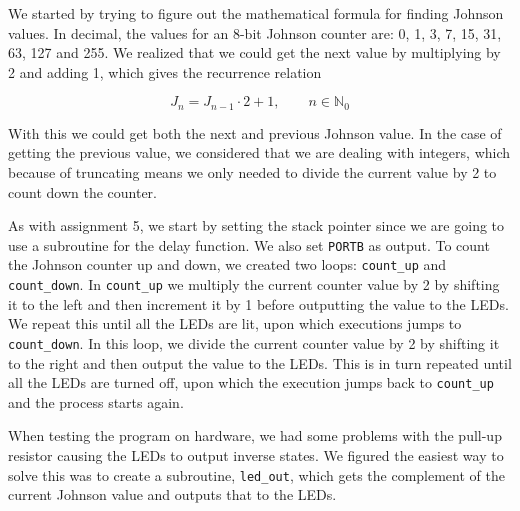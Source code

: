 We started by trying to figure out the mathematical formula for finding Johnson values. In decimal, the values for an 8-bit Johnson counter are: 0, 1, 3, 7, 15, 31, 63, 127 and 255. We realized that we could get the next value by multiplying by 2 and adding 1, which gives the recurrence relation

\begin{equation*}
    J_n = J_{n-1} \cdot 2 + 1, \qquad n \in \mathbb{N}_0
\end{equation*}

With this we could get both the next and previous Johnson value. In the case of getting the previous value, we considered that we are dealing with integers, which because of truncating means we only needed to divide the current value by 2 to count down the counter.

As with assignment 5, we start by setting the stack pointer since we are going to use a subroutine for the delay function. We also set \texttt{PORTB} as output. To count the Johnson counter up and down, we created two loops: \texttt{count\_up} and \texttt{count\_down}. In \texttt{count\_up} we multiply the current counter value by 2 by shifting it to the left and then increment it by 1 before outputting the value to the LEDs. We repeat this until all the LEDs are lit, upon which executions jumps to \texttt{count\_down}. In this loop, we divide the current counter value by 2 by shifting it to the right and then output the value to the LEDs. This is in turn repeated until all the LEDs are turned off, upon which the execution jumps back to \texttt{count\_up} and the process starts again.

When testing the program on hardware, we had some problems with the pull-up resistor causing the LEDs to output inverse states. We figured the easiest way to solve this was to create a subroutine, \texttt{led\_out}, which gets the complement of the current Johnson value and outputs that to the LEDs.
